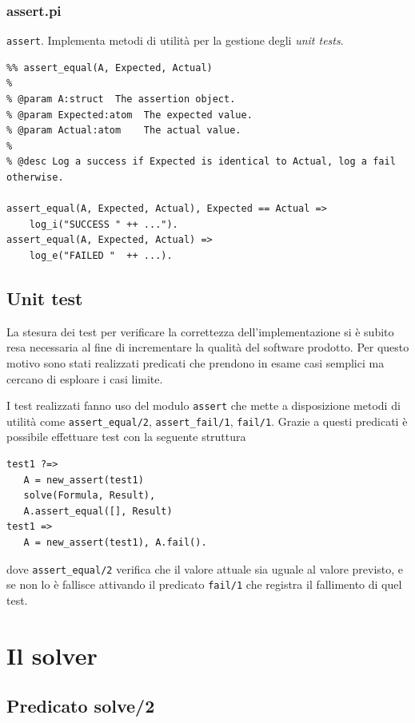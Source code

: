 \documentclass[12pt,a4paper,openright]{book} %
\begin{document}
\subsubsection{assert.pi}

\verb|assert|. Implementa metodi di utilità per la gestione degli \emph{unit tests}.

\begin{verbatim}
%% assert_equal(A, Expected, Actual)
%
% @param A:struct  The assertion object.
% @param Expected:atom  The expected value.
% @param Actual:atom    The actual value.
%
% @desc Log a success if Expected is identical to Actual, log a fail otherwise.

assert_equal(A, Expected, Actual), Expected == Actual => 
    log_i("SUCCESS " ++ ...").
assert_equal(A, Expected, Actual) => 
    log_e("FAILED "  ++ ...).
\end{verbatim}

\subsection{Unit test}
\label{ch:clpsetpicat_system_tests}

La stesura dei test per verificare la correttezza dell'implementazione si è subito resa necessaria al fine di incrementare la qualità del software prodotto. Per questo motivo sono stati realizzati predicati che prendono in esame casi semplici ma cercano di esploare i casi limite.

I test realizzati fanno uso del modulo \verb|assert| che mette a disposizione metodi di utilità come \verb|assert_equal/2|, \verb|assert_fail/1|, \verb|fail/1|. Grazie a questi predicati è possibile effettuare test con la seguente struttura
\begin{verbatim}
test1 ?=>
   A = new_assert(test1)
   solve(Formula, Result),
   A.assert_equal([], Result)
test1 => 
   A = new_assert(test1), A.fail().
\end{verbatim}
dove \verb|assert_equal/2| verifica che il valore attuale sia uguale al valore previsto, e se non lo è fallisce attivando il predicato \verb|fail/1| che registra il fallimento di quel test.

\section{Il solver}

\subsection{Predicato solve/2}
\end{document}

